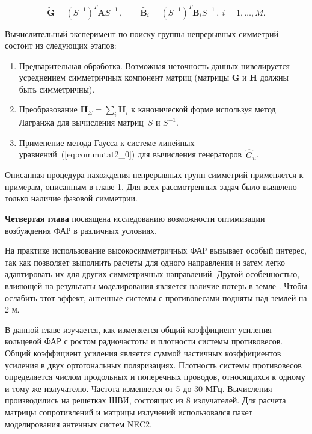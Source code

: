 \begin{equation}
\tilde{\textbf{G}}=\left(S^{-1}\right)^T \textbf{A} S^{-1} \, , \qquad
\tilde{\textbf{B}_i}=\left(S^{-1}\right)^T \textbf{B}_i S^{-1} \, , \ i=1,\dots,M.
\end{equation}

Вычислительный эксперимент по поиску группы непрерывных симметрий состоит из следующих этапов:
\begin{enumerate}
  \item Предварительная обработка. Возможная неточность данных нивелируется усреднением симметричных компонент матриц (матрицы $\textbf{G}$ и $\textbf{H}$ должны быть симметричны).
  \item %
  Преобразование $ {\textbf{H}}_{\Sigma} = \sum_{i} \textbf{H}_i$ к канонической форме используя метод Лагранжа для вычисления матриц~$S$ и $S^{-1} $.
  \item Применение метода Гаусса к системе линейных уравнений~(\ref{eq:commutat2_0}) для вычисления генераторов~$\hat{G}_n$.
\end{enumerate}


Описанная процедура нахождения непрерывных групп симметрий применяется к примерам, описанным в главе 1. Для всех рассмотренных задач было выявлено только наличие фазовой симметрии.

{\textbf{Четвертая глава}} посвящена исследованию возможности оптимизации возбуждения ФАР в различных условиях.

На практике использование высокосимметричных ФАР вызывает особый интерес, так как позволяет выполнить расчеты для одного направления и затем легко адаптировать их для других симметричных направлений. Другой особенностью, влияющей на результаты моделирования является наличие потерь в земле . Чтобы ослабить этот эффект, антенные системы с противовесами подняты над землей на 2 м.

В данной главе изучается, как изменяется общий коэффициент усиления кольцевой ФАР с ростом радиочастоты и плотности системы противовесов. Общий коэффициент усиления является суммой частичных коэффициентов усиления в  двух ортогональных поляризациях. Плотность системы противовесов определяется числом продольных и поперечных проводов, относящихся к одному и тому же излучателю. Частота изменяется от 5 до 30 МГц. Вычисления производились на решетках ШВИ, состоящих из 8 излучателей. Для расчета матрицы сопротивлений и матрицы излучений использовался пакет моделирования антенных систем NEC2.

